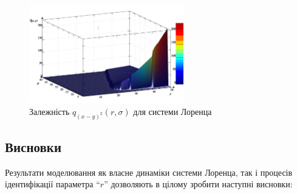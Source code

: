 \begin{figure}[htb!]
  \begin{center}
    \includegraphics[width=0.60\textwidth]{p/cha/lor/q2d/lor_qxmy2_r_sigma.png}
  \end{center}
  \caption{Залежність $q_{(x-y)^2}(r, \sigma)$ для системи Лоренца}
  \label{atu:f:lor_qxmy2_r_sigma}
\end{figure}



\subsection{Висновки}  %

Результати моделювання як власне динаміки системи Лоренца,
так і процесів ідентифікації параметра ``$r$'' дозволяють в
цілому зробити наступні висновки:

